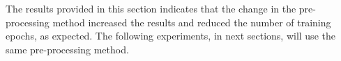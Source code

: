 The results provided in this section indicates that the change in the pre-processing method increased the results and reduced the number of training epochs, as expected.
The following experiments, in next sections, will use the same pre-processing method.
  
% 
% 
% 
% 
% 
% 
